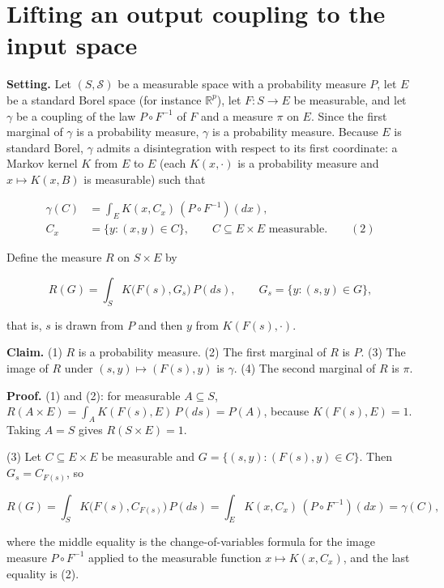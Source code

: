\documentclass[11pt,a4paper]{article}
\begin{document}
\section{\texorpdfstring{Lifting an output coupling to the input space}{Lifting an output coupling to the input space}}


\textbf{Setting.} Let \((S,\mathcal S)\) be a measurable space with a probability measure \(P\), let \(E\) be a standard Borel space (for instance \(\mathbb R^p\)), let \(F:S\to E\) be measurable, and let \(\gamma\) be a coupling of the law \(P\circ F^{-1}\) of \(F\) and a measure \(\pi\) on \(E\). Since the first marginal of \(\gamma\) is a probability measure, \(\gamma\) is a probability measure. Because \(E\) is standard Borel, \(\gamma\) admits a disintegration with respect to its first coordinate: a Markov kernel \(K\) from \(E\) to \(E\) (each \(K(x,\cdot)\) is a probability measure and \(x\mapsto K(x,B)\) is measurable) such that


\[\begin{aligned}
\gamma(C)&=\int_E K(x,C_x)\,(P\circ F^{-1})(dx),\\
C_x&=\{y:(x,y)\in C\},\qquad C\subseteq E\times E\text{ measurable}.
\qquad(2)
\end{aligned}\]


Define the measure \(R\) on \(S\times E\) by


\[R(G)=\int_S K\bigl(F(s),G_s\bigr)\,P(ds),\qquad G_s=\{y:(s,y)\in G\},\]


that is, \(s\) is drawn from \(P\) and then \(y\) from \(K(F(s),\cdot)\).




\textbf{Claim.} (1) \(R\) is a probability measure. (2) The first marginal of \(R\) is \(P\). (3) The image of \(R\) under \((s,y)\mapsto(F(s),y)\) is \(\gamma\). (4) The second marginal of \(R\) is \(\pi\).




\textbf{Proof.} (1) and (2): for measurable \(A\subseteq S\), \(R(A\times E)=\int_AK(F(s),E)\,P(ds)=P(A)\), because \(K(F(s),E)=1\). Taking \(A=S\) gives \(R(S\times E)=1\).




(3) Let \(C\subseteq E\times E\) be measurable and \(G=\{(s,y):(F(s),y)\in C\}\). Then \(G_s=C_{F(s)}\), so


\[R(G)=\int_SK\bigl(F(s),C_{F(s)}\bigr)\,P(ds)=\int_EK(x,C_x)\,(P\circ F^{-1})(dx)=\gamma(C),\]


where the middle equality is the change-of-variables formula for the image measure \(P\circ F^{-1}\) applied to the measurable function \(x\mapsto K(x,C_x)\), and the last equality is (2).
\end{document}
